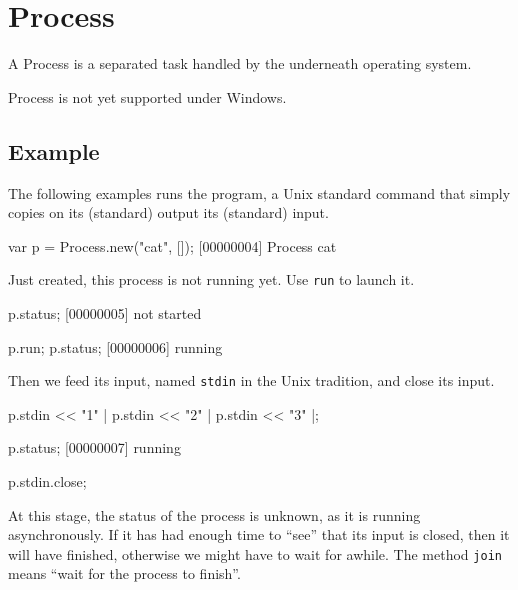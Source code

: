 
\section{Process}

A Process is a separated task handled by the underneath operating
system.

\begin{windows}
  Process is not yet supported under Windows.
\end{windows}

\subsection{Example}

The following examples runs the  program, a Unix standard
command that simply copies on its (standard) output its (standard)
input.

\begin{urbiscript}
var p = Process.new("cat", []);
[00000004] Process cat
\end{urbiscript}

\noindent
Just created, this process is not running yet.  Use \lstinline|run| to
launch it.

\begin{urbiscript}
p.status;
[00000005] not started

p.run;
p.status;
[00000006] running
\end{urbiscript}

\noindent
Then we feed its input, named \lstinline|stdin| in the Unix
tradition, and close its input.

\begin{urbiscript}
p.stdin << "1\n" |
p.stdin << "2\n" |
p.stdin << "3\n" |;

p.status;
[00000007] running

p.stdin.close;
\end{urbiscript}

\noindent
At this stage, the status of the process is unknown, as it is running
asynchronously.  If it has had enough time to ``see'' that its input
is closed, then it will have finished, otherwise we might have to wait
for awhile.  The method \lstinline|join| means ``wait for the process
to finish''.

